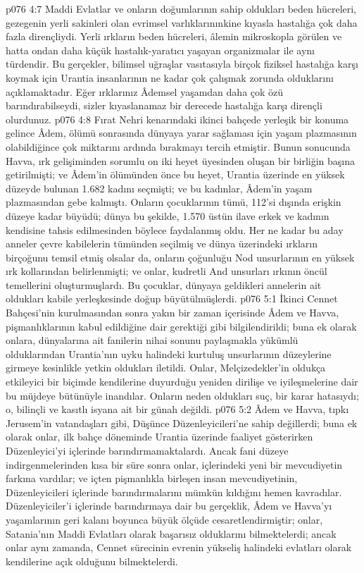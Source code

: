 \vs p076 4:7 Maddi Evlatlar ve onların doğumlarının sahip oldukları beden hücreleri, gezegenin yerli sakinleri olan evrimsel varlıklarınınkine kıyasla hastalığa çok daha fazla dirençliydi. Yerli ırkların beden hücreleri, âlemin mikroskopla görülen ve hatta ondan daha küçük hastalık\hyp{}yaratıcı yaşayan organizmalar ile aynı türdendir. Bu gerçekler, bilimsel uğraşlar vasıtasıyla birçok fiziksel hastalığa karşı koymak için Urantia insanlarının ne kadar çok çalışmak zorunda olduklarını açıklamaktadır. Eğer ırklarınız Âdemsel yaşamdan daha çok özü barındırabilseydi, sizler kıyaslanamaz bir derecede hastalığa karşı dirençli olurdunuz.
\vs p076 4:8 Fırat Nehri kenarındaki ikinci bahçede yerleşik bir konuma gelince Âdem, ölümü sonrasında dünyaya yarar sağlaması için yaşam plazmasının olabildiğince çok miktarını ardında bırakmayı tercih etmiştir. Bunun sonucunda Havva, ırk gelişiminden sorumlu on iki heyet üyesinden oluşan bir birliğin başına getirilmişti; ve Âdem’in ölümünden önce bu heyet, Urantia üzerinde en yüksek düzeyde bulunan 1.682 kadını seçmişti; ve bu kadınlar, Âdem’in yaşam plazmasından gebe kalmıştı. Onların çocuklarının tümü, 112’si dışında erişkin düzeye kadar büyüdü; dünya bu şekilde, 1.570 üstün ilave erkek ve kadının kendisine tahsis edilmesinden böylece faydalanmış oldu. Her ne kadar bu aday anneler çevre kabilelerin tümünden seçilmiş ve dünya üzerindeki ırkların birçoğunu temsil etmiş olsalar da, onların çoğunluğu Nod unsurlarının en yüksek ırk kollarından belirlenmişti; ve onlar, kudretli And unsurları ırkının öncül temellerini oluşturmuşlardı. Bu çocuklar, dünyaya geldikleri annelerin ait oldukları kabile yerleşkesinde doğup büyütülmüşlerdi.
\vs p076 5:1 İkinci Cennet Bahçesi’nin kurulmasından sonra yakın bir zaman içerisinde Âdem ve Havva, pişmanlıklarının kabul edildiğine dair gerektiği gibi bilgilendirildi; buna ek olarak onlara, dünyalarına ait fanilerin nihai sonunu paylaşmakla yükümlü olduklarından Urantia’nın uyku halindeki kurtuluş unsurlarının düzeylerine girmeye kesinlikle yetkin oldukları iletildi. Onlar, Melçizedekler’in oldukça etkileyici bir biçimde kendilerine duyurduğu yeniden dirilişe ve iyileşmelerine dair bu müjdeye bütünüyle inandılar. Onların neden oldukları suç, bir karar hatasıydı; o, bilinçli ve kasıtlı isyana ait bir günah değildi.
\vs p076 5:2 Âdem ve Havva, tıpkı Jerusem’in vatandaşları gibi, Düşünce Düzenleyicileri’ne sahip değillerdi; buna ek olarak onlar, ilk bahçe döneminde Urantia üzerinde faaliyet gösterirken Düzenleyici’yi içlerinde barındırmamaktalardı. Ancak fani düzeye indirgenmelerinden kısa bir süre sonra onlar, içlerindeki yeni bir mevcudiyetin farkına vardılar; ve içten pişmanlıkla birleşen insan mevcudiyetinin, Düzenleyicileri içlerinde barındırmalarını mümkün kıldığını hemen kavradılar. Düzenleyiciler’i içlerinde barındırmaya dair bu gerçeklik, Âdem ve Havva’yı yaşamlarının geri kalanı boyunca büyük ölçüde cesaretlendirmiştir; onlar, Satania’nın Maddi Evlatları olarak başarısız olduklarını bilmektelerdi; ancak onlar aynı zamanda, Cennet sürecinin evrenin yükseliş halindeki evlatları olarak kendilerine açık olduğunu bilmektelerdi.
